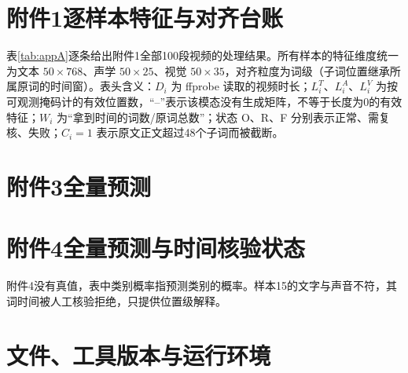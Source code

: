 \section{附件1逐样本特征与对齐台账}\label{app:A}

表\ref{tab:appA}逐条给出附件1全部100段视频的处理结果。所有样本的特征维度统一为文本 $50\times768$、声学 $50\times25$、视觉 $50\times35$，对齐粒度为词级（子词位置继承所属原词的时间窗）。表头含义：$D_i$ 为 ffprobe 读取的视频时长；$L_i^T$、$L_i^A$、$L_i^V$ 为按可观测掩码计的有效位置数，“--”表示该模态没有生成矩阵，不等于长度为0的有效特征；$W_i$ 为“拿到时间的词数/原词总数”；状态 O、R、F 分别表示正常、需复核、失败；$C_i=1$ 表示原文正文超过48个子词而被截断。



\section{附件3全量预测}\label{app:B}



\section{附件4全量预测与时间核验状态}\label{app:C}

附件4没有真值，表中类别概率指预测类别的概率。样本15的文字与声音不符，其词时间被人工核验拒绝，只提供位置级解释。



\section{文件、工具版本与运行环境}\label{app:D}


